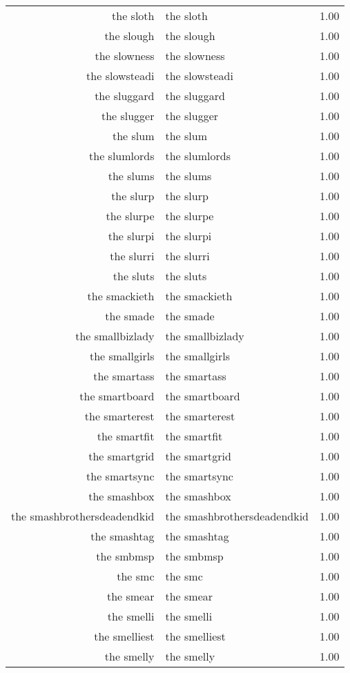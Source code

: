 \begin{table}[ht]
\begin{tabular}{rlr}
  the sloth & the sloth & 1.00 \\ 
  the slough & the slough & 1.00 \\ 
  the slowness & the slowness & 1.00 \\ 
  the slowsteadi & the slowsteadi & 1.00 \\ 
  the sluggard & the sluggard & 1.00 \\ 
  the slugger & the slugger & 1.00 \\ 
  the slum & the slum & 1.00 \\ 
  the slumlords & the slumlords & 1.00 \\ 
  the slums & the slums & 1.00 \\ 
  the slurp & the slurp & 1.00 \\ 
  the slurpe & the slurpe & 1.00 \\ 
  the slurpi & the slurpi & 1.00 \\ 
  the slurri & the slurri & 1.00 \\ 
  the sluts & the sluts & 1.00 \\ 
  the smackieth & the smackieth & 1.00 \\ 
  the smade & the smade & 1.00 \\ 
  the smallbizlady & the smallbizlady & 1.00 \\ 
  the smallgirls & the smallgirls & 1.00 \\ 
  the smartass & the smartass & 1.00 \\ 
  the smartboard & the smartboard & 1.00 \\ 
  the smarterest & the smarterest & 1.00 \\ 
  the smartfit & the smartfit & 1.00 \\ 
  the smartgrid & the smartgrid & 1.00 \\ 
  the smartsync & the smartsync & 1.00 \\ 
  the smashbox & the smashbox & 1.00 \\ 
  the smashbrothersdeadendkid & the smashbrothersdeadendkid & 1.00 \\ 
  the smashtag & the smashtag & 1.00 \\ 
  the smbmsp & the smbmsp & 1.00 \\ 
  the smc & the smc & 1.00 \\ 
  the smear & the smear & 1.00 \\ 
  the smelli & the smelli & 1.00 \\ 
  the smelliest & the smelliest & 1.00 \\ 
  the smelly & the smelly & 1.00 \\ 

\end{tabular}
\end{table}
